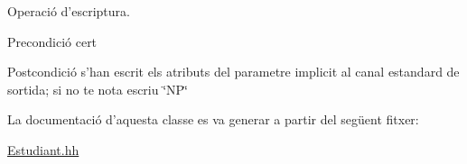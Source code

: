 Operació d'escriptura. 

\begin{DoxyPrecond}{Precondició}
cert 
\end{DoxyPrecond}
\begin{DoxyPostcond}{Postcondició}
s'han escrit els atributs del parametre implicit al canal estandard de sortida; si no te nota escriu \char`\"{}\+N\+P\char`\"{} 
\end{DoxyPostcond}


La documentació d'aquesta classe es va generar a partir del següent fitxer\+:\begin{DoxyCompactItemize}
\item 
\hyperlink{_estudiant_8hh}{Estudiant.\+hh}\end{DoxyCompactItemize}
